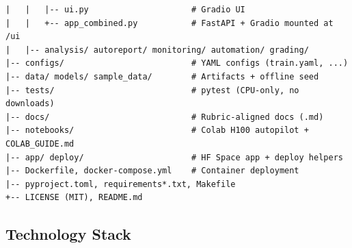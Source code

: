 \documentclass[12pt,a4paper]{article}
\begin{document}
\begin{lstlisting}[basicstyle=\ttfamily\footnotesize]
|   |   |-- ui.py                     # Gradio UI
|   |   +-- app_combined.py           # FastAPI + Gradio mounted at /ui
|   |-- analysis/ autoreport/ monitoring/ automation/ grading/
|-- configs/                          # YAML configs (train.yaml, ...)
|-- data/ models/ sample_data/        # Artifacts + offline seed
|-- tests/                            # pytest (CPU-only, no downloads)
|-- docs/                             # Rubric-aligned docs (.md)
|-- notebooks/                        # Colab H100 autopilot + COLAB_GUIDE.md
|-- app/ deploy/                      # HF Space app + deploy helpers
|-- Dockerfile, docker-compose.yml    # Container deployment
|-- pyproject.toml, requirements*.txt, Makefile
+-- LICENSE (MIT), README.md
\end{lstlisting}

\subsection{Technology Stack}
\end{document}
